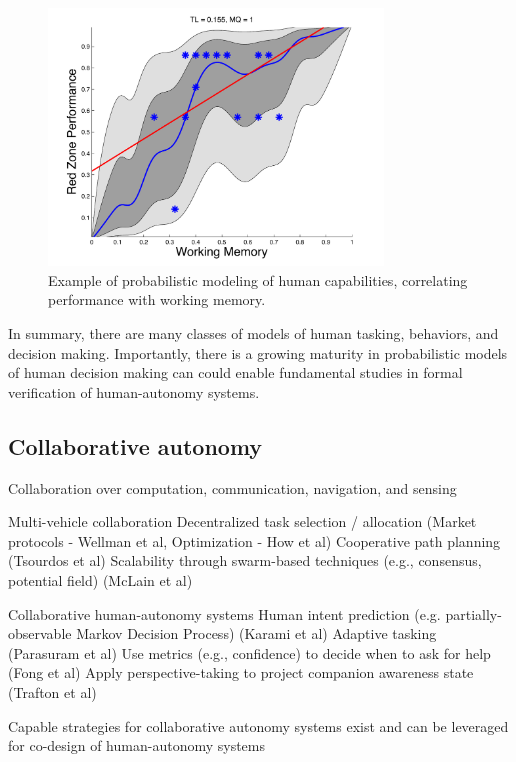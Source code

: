 \begin{figure}[h] 
   \centering
   \includegraphics[width=3.5in]{GP-fig.pdf} 
   \caption{Example of probabilistic modeling of human capabilities, correlating performance with working memory.}
   \label{fig:prob-humans}
\end{figure}

In summary, there are many classes of models of human tasking, behaviors, and decision making. Importantly, there is a growing maturity in probabilistic models of human decision making can could enable fundamental studies in formal verification of human-autonomy systems. 


\subsection*{Collaborative autonomy}


Collaboration over computation, communication, navigation, and sensing

Multi-vehicle collaboration 
Decentralized task selection / allocation (Market protocols - Wellman et al, Optimization - How et al) 
Cooperative path planning (Tsourdos et al)
Scalability through swarm-based techniques (e.g., consensus, potential field)  (McLain et al)

Collaborative human-autonomy systems
Human intent prediction (e.g. partially-observable Markov Decision Process) (Karami et al)
Adaptive tasking (Parasuram et al)
Use metrics (e.g., confidence) to decide when to ask for help (Fong et al) 
Apply perspective-taking to project companion awareness state (Trafton et al)


Capable strategies for collaborative autonomy systems exist and can be 
leveraged for co-design of human-autonomy systems


